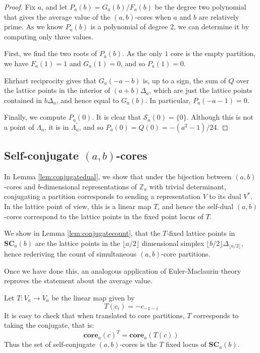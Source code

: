 \documentclass{amsart}[12pt]
\theoremstyle{definition}
\newcommand{\Z}{\mathbb{Z}}
\newcommand{\core}{\mathbf{core}}
\newcommand{\SC}{\mathbf{SC}}
\begin{document}
\begin{proof}

Fix $a$, and let $P_a(b)=G_a(b)/F_a(b)$ be the degree two polynomial that
gives the average value of the $(a,b)$-cores when $a$ and $b$ are
relatively prime.  As we know $P_a(b)$ is a polynomial of degree 2, we can determine it by computing only three values.

First, we find the two roots of $P_a(b)$.  As the only $1$ core is the empty partition, we have $F_a(1)=1$ and $G_a(1)=0$, and so $P_a(1)=0$.

Ehrhart reciprocity gives that $G_a(-a-b)$ is, up to a sign, the sum of $Q$ over the lattice points in the interior of $(a+b)\Delta_a$, which are just the lattice points contained in $b\Delta_a$, and hence equal to $G_a(b)$.  In particular, $P_a(-a-1)=0$.  

Finally, we compute $P_a(0)$.  It is clear that $\mathcal{S}_a(0)=\{0\}$.  Although this is not a point of $\Lambda_a$, it is in $\Lambda_a^\prime$, and so $P_a(0)=Q(0)=-(a^2-1)/24$.
\end{proof}

\subsection{Self-conjugate \texorpdfstring{$(a,b)$}{(a,b)}-cores} \label{sec:conjugate}

In Lemma \ref{lem:conjugatedual}, we show that under the bijection between $(a,b)$-cores and $b$-dimensional representations of $\Z_a$ with trivial determinant, conjugating a partition corresponds to sending a representation $V$ to its dual $V^*$.  In the lattice point of view, this is a linear map $T$, and hence the self-dual $(a,b)$-cores correspond to the lattice points in the fixed point locus of $T$.  

We show in Lemma \ref{lem:conjugatecount}, that the $T$-fixed lattice points in $\SC_a(b)$ are the lattice points in the $\lfloor a/2\rfloor$ dimensional simplex $\lfloor b/2\rfloor \Delta_{\lfloor a/2\rfloor}$, hence rederiving the count of simultaneous $(a,b)$-core partitions.  

Once we have done this, an analogous application of Euler-Maclaurin theory reproves the statement about the average value.

Let $T:V_a\to V_a$ be the linear map given by
$$T(c_i)=-c_{-1-i}$$
It is easy to check that when translated to core partitions, $T$ corresponds to taking the conjugate, that is: $$\core_a(c)^T=\core_a(T(c))$$
Thus the set of self-conjugate $(a,b)$-cores is the $T$ fixed locus of $\SC_a(b)$.  
\end{document}
